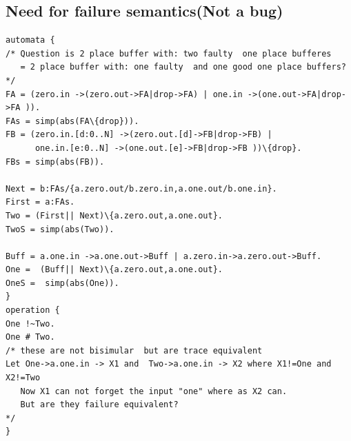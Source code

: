\documentclass[]{article}
\begin{document}
\subsection{Need for failure semantics(Not a bug)}
\begin{verbatim}
automata {
/* Question is 2 place buffer with: two faulty  one place bufferes 
   = 2 place buffer with: one faulty  and one good one place buffers?
*/  
FA = (zero.in ->(zero.out->FA|drop->FA) | one.in ->(one.out->FA|drop->FA )).
FAs = simp(abs(FA\{drop})).
FB = (zero.in.[d:0..N] ->(zero.out.[d]->FB|drop->FB) | 
      one.in.[e:0..N] ->(one.out.[e]->FB|drop->FB ))\{drop}.
FBs = simp(abs(FB)).

Next = b:FAs/{a.zero.out/b.zero.in,a.one.out/b.one.in}.
First = a:FAs.
Two = (First|| Next)\{a.zero.out,a.one.out}.
TwoS = simp(abs(Two)).

Buff = a.one.in ->a.one.out->Buff | a.zero.in->a.zero.out->Buff.
One =  (Buff|| Next)\{a.zero.out,a.one.out}.
OneS =  simp(abs(One)).
}
operation {
One !~Two.
One # Two.
/* these are not bisimular  but are trace equivalent  
Let One->a.one.in -> X1 and  Two->a.one.in -> X2 where X1!=One and X2!=Two
   Now X1 can not forget the input "one" where as X2 can. 
   But are they failure equivalent?
*/
}
\end{verbatim}

 
 
\end{document}
